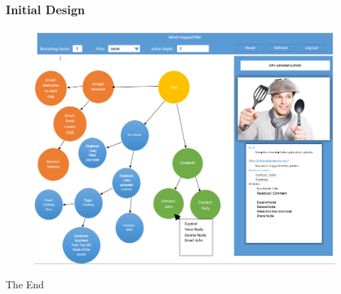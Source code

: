 \documentclass{beamer}
\begin{document}
		\begin{frame}
		\frametitle{Initial Design}
			\begin{figure}
				\includegraphics[scale=0.35]{initdesign.png}
			\end{figure}
		\end{frame}
		\begin{frame}
			\Huge{\centerline{The End}}
		\end{frame}
\end{document}
